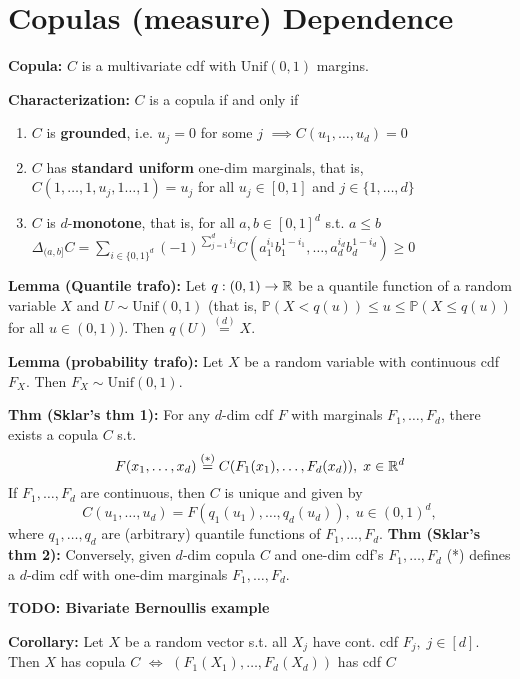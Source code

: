 \small
\section*{Copulas (measure) Dependence}

\textbf{Copula:} $C$ is a multivariate cdf with $\text{Unif}(0,1)$ margins.

\textbf{Characterization:} $C$ is a copula if and only if
\begin{enumerate}
    \item $C$ is \textbf{grounded}, i.e. $ u_j=0$ for some $j$ $\implies C(u_1,\dots,u_d)=0$
    \item $C$ has \textbf{standard uniform} one-dim marginals, that is, $C(1,\dots,1,u_j,1\dots,1)=u_j$ for all $u_j\in[0,1]$ and $j\in\{1,\dots,d\}$
    \item $C$ is $d$-\textbf{monotone}, that is, for all $a,b\in[0,1]^d$ s.t. $a\leq b$\\
    $\Delta_{(a,b]}  C=\sum_{i\in\{0,1\}^d}(-1)^{\sum^d_{j=1}i_j}C(a_1^{i_1}b_1^{1-i_1},\dots,a_d^{i_d}b_d^{1-i_d})\geq 0$
\end{enumerate}

\textbf{Lemma (Quantile trafo):} Let $q:(0,1)\rightarrow\mathbb{R}$ be a quantile function of a random variable $X$ and $U\sim\text{Unif}(0,1)$
(that is, $\mathbb{P}(X < q(u))\leq u \leq \mathbb{P}(X\leq q(u))$ for all $u\in(0,1)$).
Then $q(U)\stackrel{(d)}{=}X$.

\textbf{Lemma (probability trafo):}
Let $X$ be a random variable with continuous cdf $F_X$. Then $F_X\sim\text{Unif}(0,1)$.

\textbf{Thm (Sklar's thm 1):}
For any $d$-dim cdf $F$ with marginals $F_1,\dots,F_d$, there exists a copula $C$ s.t.
    \[F(x_1,\dots,x_d)\stackrel{(*)}{=}C(F_1(x_1),\dots,F_d(x_d)),\; x\in\mathbb{R}^d\]
    If $F_1,\dots,F_d$ are continuous, then $C$ is unique and given by\\
    \[C(u_1,\dots,u_d)=F(q_1(u_1),\dots,q_d(u_d)),\; u\in(0,1)^d,\]
    where $q_1,\dots,q_d$ are (arbitrary) quantile functions of $F_1,\dots,F_d$.
\textbf{Thm (Sklar's thm 2):} Conversely, given $d$-dim copula $C$ and one-dim cdf's $F_1,\dots,F_d$ (*) defines a $d$-dim cdf with one-dim marginals $F_1,\dots,F_d$.

\textbf{TODO: Bivariate Bernoullis example}

\textbf{Corollary:} Let $X$ be a random vector s.t. all $X_j$ have cont. cdf $F_j,\; j\in [d]$.
Then $X$ has copula $C$ $\iff$ $(F_1(X_1),\dots,F_d(X_d))$ has cdf $C$

